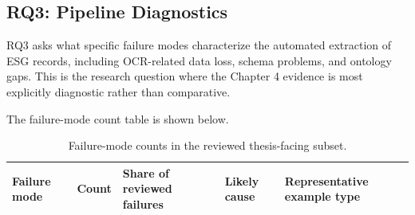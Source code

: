 \documentclass[english, online, cse, master]{dithesis}
\begin{document}
\subsection{RQ3: Pipeline Diagnostics}

RQ3 asks what specific failure modes characterize the automated extraction of ESG records, including OCR-related data loss, schema problems, and ontology gaps. This is the research question where the Chapter 4 evidence is most explicitly diagnostic rather than comparative.

The failure-mode count table is shown below.

\begin{landscape}
\begin{table}[p]
\centering
\caption{Failure-mode counts in the reviewed thesis-facing subset.}
\label{tab:failure-mode-counts}
\small
\renewcommand{\arraystretch}{1.2}
\begin{tabularx}{\linewidth}{|X|p{1.8cm}|p{1.8cm}|X|X|}
\hline
\textbf{Failure mode} & \textbf{Count} & \textbf{Share of reviewed failures} & \textbf{Likely cause} & \textbf{Representative example type} \\ \hline


\end{tabularx}
\end{table}
\end{landscape}
\end{document}
